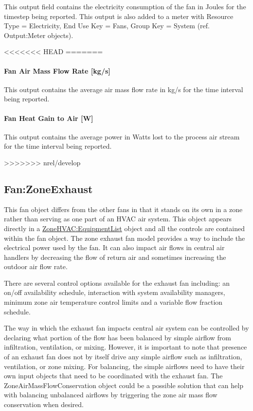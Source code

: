 This output field contains the electricity consumption of the fan in Joules for the timestep being reported. This output is also added to a meter with Resource Type = Electricity, End Use Key = Fans, Group Key = System (ref. Output:Meter objects).

<<<<<<< HEAD
=======
\paragraph{Fan Air Mass Flow Rate {[}kg/s{]}}\label{fan-air-mass-flow-kgs-2}

This output contains the average air mass flow rate in kg/s for the time interval being reported.

\paragraph{Fan Heat Gain to Air {[}W{]}}\label{fan-heat-gain-to-air-w-2}

This output contains the average power in Watts lost to the process air stream for the time interval being reported.

>>>>>>> nrel/develop
\subsection{Fan:ZoneExhaust}\label{fanzoneexhaust}

This fan object differs from the other fans in that it stands on its own in a zone rather than serving as one part of an HVAC air system. This object appears directly in a \hyperref[zonehvacequipmentlist]{ZoneHVAC:EquipmentList} object and all the controls are contained within the fan object. The zone exhaust fan model provides a way to include the electrical power used by the fan. It can also impact air flows in central air handlers by decreasing the flow of return air and sometimes increasing the outdoor air flow rate.

There are several control options available for the exhaust fan including: an on/off availability schedule, interaction with system availability managers, minimum zone air temperature control limits and a variable flow fraction schedule.

The way in which the exhaust fan impacts central air system can be controlled by declaring what portion of the flow has been balanced by simple airflow from infiltration, ventilation, or mixing. However, it is important to note that presence of an exhaust fan does not by itself drive any simple airflow such as infiltration, ventilation, or zone mixing. For balancing, the simple airflows need to have their own input objects that need to be coordinated with the exhaust fan. The ZoneAirMassFlowConservation object could be a possible solution that can help with balancing unbalanced airflows by triggering the zone air mass flow conservation when desired.

